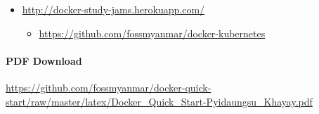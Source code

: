 \begin{itemize}
\tightlist
\item
  \url{http://docker-study-jams.herokuapp.com/}

  \begin{itemize}
  \tightlist
  \item
    \url{https://github.com/fossmyanmar/docker-kubernetes}
  \end{itemize}
\end{itemize}

\hypertarget{pdf-download-1}{%
\paragraph{PDF Download}\label{pdf-download-1}}

\url{https://github.com/fossmyanmar/docker-quick-start/raw/master/latex/Docker_Quick_Start-Pyidaungsu_Khayay.pdf}

\pagebreak
